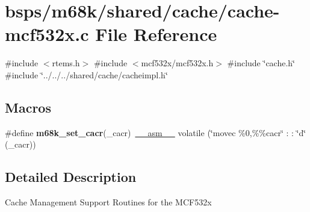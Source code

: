 \hypertarget{cache-mcf532x_8c}{}\section{bsps/m68k/shared/cache/cache-\/mcf532x.c File Reference}
\label{cache-mcf532x_8c}
{\ttfamily \#include $<$rtems.\+h$>$}\newline
{\ttfamily \#include $<$mcf532x/mcf532x.\+h$>$}\newline
{\ttfamily \#include \char`\"{}cache.\+h\char`\"{}}\newline
{\ttfamily \#include \char`\"{}../../../shared/cache/cacheimpl.\+h\char`\"{}}\newline
\subsection*{Macros}
\begin{DoxyCompactItemize}
\item 
\mbox{\label{cache-mcf532x_8c_a5d7413ba7f4555a93355c5760cb9136a}} 
\#define {\bfseries m68k\+\_\+set\+\_\+cacr}(\+\_\+cacr)~\mbox{\hyperlink{group__RTEMSScoreCPUSPARC_ga82257d4fc068f4b21b029dd69d276839}{\+\_\+\+\_\+asm\+\_\+\+\_\+}} volatile (\char`\"{}movec \%0,\%\%cacr\char`\"{} \+: \+: \char`\"{}d\char`\"{} (\+\_\+cacr))
\end{DoxyCompactItemize}


\subsection{Detailed Description}
Cache Management Support Routines for the M\+C\+F532x 